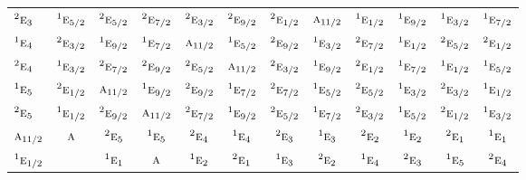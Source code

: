 \documentclass[10pt,a4paper]{article}
\numberwithin{equation}{section}
\newcommand{\irr}[1]{\text{\normalfont\scshape #1}}
\newcommand{\conjpair}[1]{{}^{#1}}
\begin{document}
{\begin{longtable}{@{}lccccccccccc@{}}
$\conjpair{2}\irr{e}_{3}$ & $\conjpair{1}\irr{e}_{5/2}$ & $\conjpair{2}\irr{e}_{5/2}$ & $\conjpair{2}\irr{e}_{7/2}$ & $\conjpair{2}\irr{e}_{3/2}$ & $\conjpair{2}\irr{e}_{9/2}$ & $\conjpair{2}\irr{e}_{1/2}$ & $\irr{a}_{11/2}$ & $\conjpair{1}\irr{e}_{1/2}$ & $\conjpair{1}\irr{e}_{9/2}$ & $\conjpair{1}\irr{e}_{3/2}$ & $\conjpair{1}\irr{e}_{7/2}$\\
$\conjpair{1}\irr{e}_{4}$ & $\conjpair{2}\irr{e}_{3/2}$ & $\conjpair{1}\irr{e}_{9/2}$ & $\conjpair{1}\irr{e}_{7/2}$ & $\irr{a}_{11/2}$ & $\conjpair{1}\irr{e}_{5/2}$ & $\conjpair{2}\irr{e}_{9/2}$ & $\conjpair{1}\irr{e}_{3/2}$ & $\conjpair{2}\irr{e}_{7/2}$ & $\conjpair{1}\irr{e}_{1/2}$ & $\conjpair{2}\irr{e}_{5/2}$ & $\conjpair{2}\irr{e}_{1/2}$\\
$\conjpair{2}\irr{e}_{4}$ & $\conjpair{1}\irr{e}_{3/2}$ & $\conjpair{2}\irr{e}_{7/2}$ & $\conjpair{2}\irr{e}_{9/2}$ & $\conjpair{2}\irr{e}_{5/2}$ & $\irr{a}_{11/2}$ & $\conjpair{2}\irr{e}_{3/2}$ & $\conjpair{1}\irr{e}_{9/2}$ & $\conjpair{2}\irr{e}_{1/2}$ & $\conjpair{1}\irr{e}_{7/2}$ & $\conjpair{1}\irr{e}_{1/2}$ & $\conjpair{1}\irr{e}_{5/2}$\\
$\conjpair{1}\irr{e}_{5}$ & $\conjpair{2}\irr{e}_{1/2}$ & $\irr{a}_{11/2}$ & $\conjpair{1}\irr{e}_{9/2}$ & $\conjpair{2}\irr{e}_{9/2}$ & $\conjpair{1}\irr{e}_{7/2}$ & $\conjpair{2}\irr{e}_{7/2}$ & $\conjpair{1}\irr{e}_{5/2}$ & $\conjpair{2}\irr{e}_{5/2}$ & $\conjpair{1}\irr{e}_{3/2}$ & $\conjpair{2}\irr{e}_{3/2}$ & $\conjpair{1}\irr{e}_{1/2}$\\
$\conjpair{2}\irr{e}_{5}$ & $\conjpair{1}\irr{e}_{1/2}$ & $\conjpair{2}\irr{e}_{9/2}$ & $\irr{a}_{11/2}$ & $\conjpair{2}\irr{e}_{7/2}$ & $\conjpair{1}\irr{e}_{9/2}$ & $\conjpair{2}\irr{e}_{5/2}$ & $\conjpair{1}\irr{e}_{7/2}$ & $\conjpair{2}\irr{e}_{3/2}$ & $\conjpair{1}\irr{e}_{5/2}$ & $\conjpair{2}\irr{e}_{1/2}$ & $\conjpair{1}\irr{e}_{3/2}$\\
$\irr{a}_{11/2}$ & $\irr{a}$ & $\conjpair{2}\irr{e}_{5}$ & $\conjpair{1}\irr{e}_{5}$ & $\conjpair{2}\irr{e}_{4}$ & $\conjpair{1}\irr{e}_{4}$ & $\conjpair{2}\irr{e}_{3}$ & $\conjpair{1}\irr{e}_{3}$ & $\conjpair{2}\irr{e}_{2}$ & $\conjpair{1}\irr{e}_{2}$ & $\conjpair{2}\irr{e}_{1}$ & $\conjpair{1}\irr{e}_{1}$\\
$\conjpair{1}\irr{e}_{1/2}$ &  & $\conjpair{1}\irr{e}_{1}$ & $\irr{a}$ & $\conjpair{1}\irr{e}_{2}$ & $\conjpair{2}\irr{e}_{1}$ & $\conjpair{1}\irr{e}_{3}$ & $\conjpair{2}\irr{e}_{2}$ & $\conjpair{1}\irr{e}_{4}$ & $\conjpair{2}\irr{e}_{3}$ & $\conjpair{1}\irr{e}_{5}$ & $\conjpair{2}\irr{e}_{4}$\\

\end{longtable}}
\end{document}
